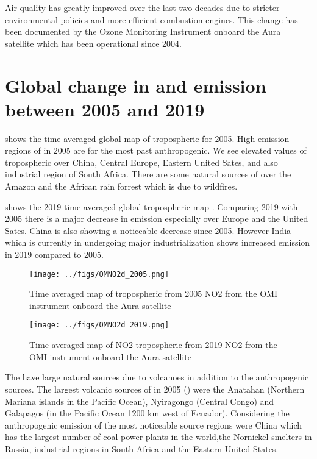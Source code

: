 Air quality has greatly improved over the last two decades due to stricter environmental
policies and more efficient combustion engines. This change has been documented by the 
Ozone Monitoring Instrument onboard the Aura satellite which has been operational since 2004.   
\section*{Global change in  and  emission between 2005 and 2019} 
 shows the time averaged global map of tropospheric 
 for 2005. High emission regions of  in 2005 are for the most past 
anthropogenic. We see elevated values of tropospheric  over 
China, Central Europe, Eastern United Sates, and also industrial region of South Africa. There 
are some natural sources of  over the Amazon and the African rain forrest which is due 
to wildfires.  

 shows the 2019 time averaged global tropospheric
map  . Comparing 2019 with 2005 there is a major 
decrease in  emission especially over Europe and the United Sates. China is also 
showing a noticeable decrease since 2005. However India which is currently in undergoing 
major industrialization shows increased  emission in 2019 compared to 2005. 

\begin{figure}[htbp]
    \centering
        \texttt{[image: ../figs/OMNO2d\_2005.png]}
    \caption{Time averaged map of  tropospheric from 2005 NO2 from the OMI instrument
    onboard the Aura satellite   }
    \label{fig:OMI_global_2005NO2}
\end{figure}

\begin{figure}[htpb]
    \centering
        \texttt{[image: ../figs/OMNO2d\_2019.png]}
    \caption{Time averaged map of NO2 tropospheric from 2019 NO2 from the OMI instrument  
    onboard the Aura satellite}
    \label{fig:OMI_global_2019NO2}
\end{figure}

The  have large natural sources due to volcanoes in addition to the
anthropogenic sources. The largest volcanic sources of  
in 2005 () were the Anatahan (Northern Mariana 
islands in the Pacific Ocean), Nyiragongo (Central Congo) and Galapagos 
(in the Pacific Ocean 1200 km west of Ecuador). Considering the anthropogenic 
emission of  the most noticeable source regions were China 
which has the largest number of coal power plants in the world,the 
Nornickel smelters in Russia, industrial regions in South Africa and the Eastern United States.   

